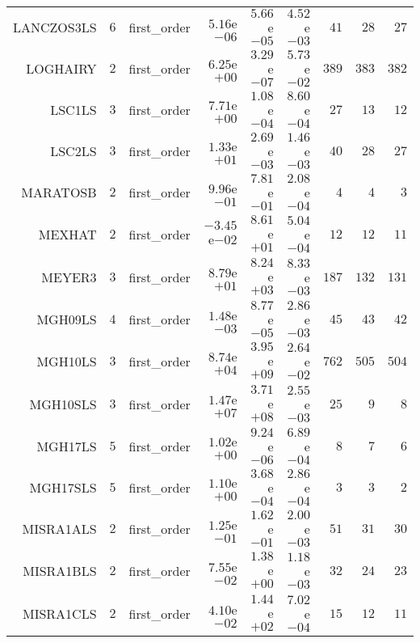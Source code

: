 \begin{longtable}{rrrrrrrrr}
LANCZOS3LS & \(     6\) & first\_order & \( 5.16\)e\(-06\) & \( 5.66\)e\(-05\) & \( 4.52\)e\(-03\) & \(    41\) & \(    28\) & \(    27\) \\
LOGHAIRY & \(     2\) & first\_order & \( 6.25\)e\(+00\) & \( 3.29\)e\(-07\) & \( 5.73\)e\(-02\) & \(   389\) & \(   383\) & \(   382\) \\
LSC1LS & \(     3\) & first\_order & \( 7.71\)e\(+00\) & \( 1.08\)e\(-04\) & \( 8.60\)e\(-04\) & \(    27\) & \(    13\) & \(    12\) \\
LSC2LS & \(     3\) & first\_order & \( 1.33\)e\(+01\) & \( 2.69\)e\(-03\) & \( 1.46\)e\(-03\) & \(    40\) & \(    28\) & \(    27\) \\
MARATOSB & \(     2\) & first\_order & \( 9.96\)e\(-01\) & \( 7.81\)e\(-01\) & \( 2.08\)e\(-04\) & \(     4\) & \(     4\) & \(     3\) \\
MEXHAT & \(     2\) & first\_order & \(-3.45\)e\(-02\) & \( 8.61\)e\(+01\) & \( 5.04\)e\(-04\) & \(    12\) & \(    12\) & \(    11\) \\
MEYER3 & \(     3\) & first\_order & \( 8.79\)e\(+01\) & \( 8.24\)e\(+03\) & \( 8.33\)e\(-03\) & \(   187\) & \(   132\) & \(   131\) \\
MGH09LS & \(     4\) & first\_order & \( 1.48\)e\(-03\) & \( 8.77\)e\(-05\) & \( 2.86\)e\(-03\) & \(    45\) & \(    43\) & \(    42\) \\
MGH10LS & \(     3\) & first\_order & \( 8.74\)e\(+04\) & \( 3.95\)e\(+09\) & \( 2.64\)e\(-02\) & \(   762\) & \(   505\) & \(   504\) \\
MGH10SLS & \(     3\) & first\_order & \( 1.47\)e\(+07\) & \( 3.71\)e\(+08\) & \( 2.55\)e\(-03\) & \(    25\) & \(     9\) & \(     8\) \\
MGH17LS & \(     5\) & first\_order & \( 1.02\)e\(+00\) & \( 9.24\)e\(-06\) & \( 6.89\)e\(-04\) & \(     8\) & \(     7\) & \(     6\) \\
MGH17SLS & \(     5\) & first\_order & \( 1.10\)e\(+00\) & \( 3.68\)e\(-04\) & \( 2.86\)e\(-04\) & \(     3\) & \(     3\) & \(     2\) \\
MISRA1ALS & \(     2\) & first\_order & \( 1.25\)e\(-01\) & \( 1.62\)e\(-01\) & \( 2.00\)e\(-03\) & \(    51\) & \(    31\) & \(    30\) \\
MISRA1BLS & \(     2\) & first\_order & \( 7.55\)e\(-02\) & \( 1.38\)e\(+00\) & \( 1.18\)e\(-03\) & \(    32\) & \(    24\) & \(    23\) \\
MISRA1CLS & \(     2\) & first\_order & \( 4.10\)e\(-02\) & \( 1.44\)e\(+02\) & \( 7.02\)e\(-04\) & \(    15\) & \(    12\) & \(    11\) \\

\end{longtable}
